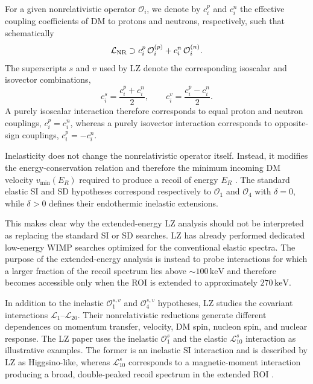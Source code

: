 \documentclass[aps,prd,reprint,superscriptaddress,nofootinbib,longbibliography,floatfix]{revtex4-2}
\newcommand{\keV}{\mathrm{keV}}
\begin{document}
For a given nonrelativistic operator $\mathcal{O}_i$, we denote by $c_i^p$ and $c_i^n$ the effective coupling coefficients of DM to protons and neutrons, respectively, such that schematically
\begin{equation}
\mathcal{L}_{\rm NR}\supset
c_i^p\,\mathcal{O}_i^{(p)}
+
c_i^n\,\mathcal{O}_i^{(n)} .
\end{equation}
The superscripts $s$ and $v$ used by LZ denote the corresponding isoscalar and isovector combinations,
\begin{equation}
c_i^s=\frac{c_i^p+c_i^n}{2},
\qquad
c_i^v=\frac{c_i^p-c_i^n}{2}.
\end{equation}
A purely isoscalar interaction therefore corresponds to equal proton and neutron couplings, $c_i^p=c_i^n$, whereas a purely isovector interaction corresponds to opposite-sign couplings, $c_i^p=-c_i^n$.

Inelasticity does not change the nonrelativistic operator itself. Instead, it modifies the energy-conservation relation and therefore the minimum incoming DM velocity $v_{\min}(E_R)$ required to produce a recoil of energy $E_R$ \cite{Barello2014}. The standard elastic SI and SD hypotheses correspond respectively to $\mathcal{O}_1$ and $\mathcal{O}_4$ with $\delta=0$, while $\delta>0$ defines their endothermic inelastic extensions.

This makes clear why the extended-energy LZ analysis should not be interpreted as replacing the standard SI or SD searches. LZ has already performed dedicated low-energy WIMP searches optimized for the conventional elastic spectra. The purpose of the extended-energy analysis is instead to probe interactions for which a larger fraction of the recoil spectrum lies above $\sim100\,\keV$ and therefore becomes accessible only when the ROI is extended to approximately $270\,\keV$.

In addition to the inelastic $\mathcal{O}_1^{s,v}$ and $\mathcal{O}_4^{s,v}$ hypotheses, LZ studies the covariant interactions $\mathcal{L}_1$--$\mathcal{L}_{20}$. Their nonrelativistic reductions generate different dependences on momentum transfer, velocity, DM spin, nucleon spin, and nuclear response. The LZ paper uses the inelastic $\mathcal{O}_1^s$ and the elastic $\mathcal{L}_{10}^s$ interaction as illustrative examples. The former is an inelastic SI interaction and is described by LZ as Higgsino-like, whereas $\mathcal{L}_{10}^s$ corresponds to a magnetic-moment interaction producing a broad, double-peaked recoil spectrum in the extended ROI \cite{LZ2026Extended}.
\end{document}
